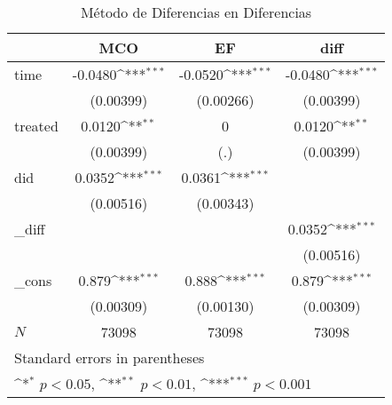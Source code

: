 \begin{table}[htbp]\centering
\def\sym#1{\ifmmode^{#1}\else\(^{#1}\)\fi}
\caption{Método de Diferencias en Diferencias\label{Cuadro1}}
\begin{tabular}{l*{3}{c}}
\hline\hline
            &\multicolumn{1}{c}{MCO}&\multicolumn{1}{c}{EF}&\multicolumn{1}{c}{diff}\\
\hline
time        &     -0.0480\sym{***}&     -0.0520\sym{***}&     -0.0480\sym{***}\\
            &   (0.00399)         &   (0.00266)         &   (0.00399)         \\
[1em]
treated     &      0.0120\sym{**} &           0         &      0.0120\sym{**} \\
            &   (0.00399)         &         (.)         &   (0.00399)         \\
[1em]
did         &      0.0352\sym{***}&      0.0361\sym{***}&                     \\
            &   (0.00516)         &   (0.00343)         &                     \\
[1em]
\_diff       &                     &                     &      0.0352\sym{***}\\
            &                     &                     &   (0.00516)         \\
[1em]
\_cons      &       0.879\sym{***}&       0.888\sym{***}&       0.879\sym{***}\\
            &   (0.00309)         &   (0.00130)         &   (0.00309)         \\
\hline
\(N\)       &       73098         &       73098         &       73098         \\
\hline\hline
\multicolumn{4}{l}{\footnotesize Standard errors in parentheses}\\
\multicolumn{4}{l}{\footnotesize \sym{*} \(p<0.05\), \sym{**} \(p<0.01\), \sym{***} \(p<0.001\)}\\
\end{tabular}
\end{table}
